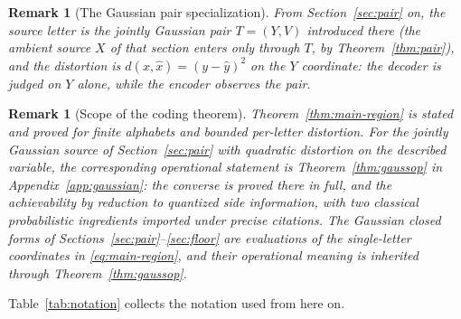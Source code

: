 ﻿\documentclass[11pt,onecolumn]{IEEEtran}
\newtheorem{remark}[theorem]{Remark}
\begin{document}
\begin{remark}[The Gaussian pair specialization]\label{rem:specialization}
From Section~\ref{sec:pair} on, the source letter is the jointly Gaussian
pair $T=(Y,V)$ introduced there (the ambient source $X$ of that section
enters only through $T$, by Theorem~\ref{thm:pair}), and the distortion is
$d(x,\hat x)=(y-\hat y)^2$ on the $Y$ coordinate: the decoder is judged on
$Y$ alone, while the encoder observes the pair.
\end{remark}

\begin{remark}[Scope of the coding theorem]\label{rem:scope}
Theorem~\ref{thm:main-region} is stated and proved for finite alphabets and
bounded per-letter distortion. For the jointly Gaussian source of
Section~\ref{sec:pair} with quadratic distortion on the described
variable, the corresponding operational statement is
Theorem~\ref{thm:gaussop} in Appendix~\ref{app:gaussian}: the converse
is proved there in full, and the achievability by reduction to quantized
side information, with two classical probabilistic ingredients imported
under precise citations. The Gaussian closed forms of
Sections~\ref{sec:pair}--\ref{sec:floor} are evaluations of the
single-letter coordinates in \eqref{eq:main-region}, and their
operational meaning is inherited through Theorem~\ref{thm:gaussop}.
\end{remark}

Table~\ref{tab:notation} collects the notation used from here on.
\end{document}
